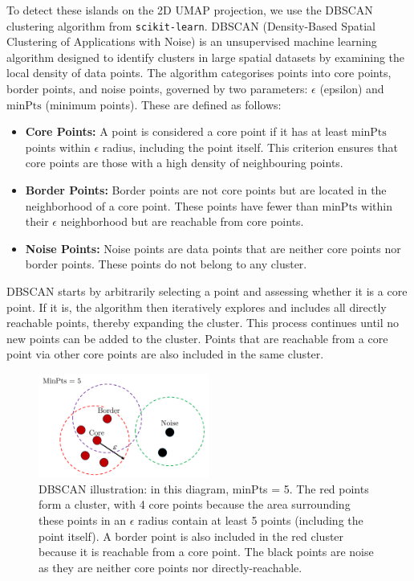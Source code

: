 \documentclass[a4paper,12pt]{article}
\begin{document}
To detect these islands on the 2D UMAP projection, we use the DBSCAN clustering algorithm \cite{dbscan} from \verb|scikit-learn|. DBSCAN (Density-Based Spatial Clustering of Applications with Noise) is an unsupervised machine learning algorithm designed to identify clusters in large spatial datasets by examining the local density of data points. The algorithm categorises points into core points, border points, and noise points, governed by two parameters: $\epsilon$ (epsilon) and $\text{minPts}$ (minimum points). These are defined as follows:
\begin{itemize}
    \item \textbf{Core Points:} A point is considered a core point if it has at least $\text{minPts}$ points within $\epsilon$ radius, including the point itself. This criterion ensures that core points are those with a high density of neighbouring points.

    \item \textbf{Border Points:} Border points are not core points but are located in the neighborhood of a core point. These points have fewer than $\text{minPts}$ within their $\epsilon$ neighborhood but are reachable from core points.

    \item \textbf{Noise Points:} Noise points are data points that are neither core points nor border points. These points do not belong to any cluster.
\end{itemize}
DBSCAN starts by arbitrarily selecting a point and assessing whether it is a core point. If it is, the algorithm then iteratively explores and includes all directly reachable points, thereby expanding the cluster. This process continues until no new points can be added to the cluster. Points that are reachable from a core point via other core points are also included in the same cluster.
\begin{figure}[H]
    \centering
    \includegraphics[width=0.5\textwidth]{../figures/dbscan_diagram.png}
    \caption{DBSCAN illustration: in this diagram, minPts = 5. 
    The red points form a cluster, with 4 core points because the area surrounding these points in an $\epsilon$ radius contain at least 5 points (including the point itself). A border point is also included in the red cluster because it is reachable from a core point. The black points are noise as they are neither core points nor directly-reachable.}
    \label{fig:dbscan}
\end{figure}
\end{document}
